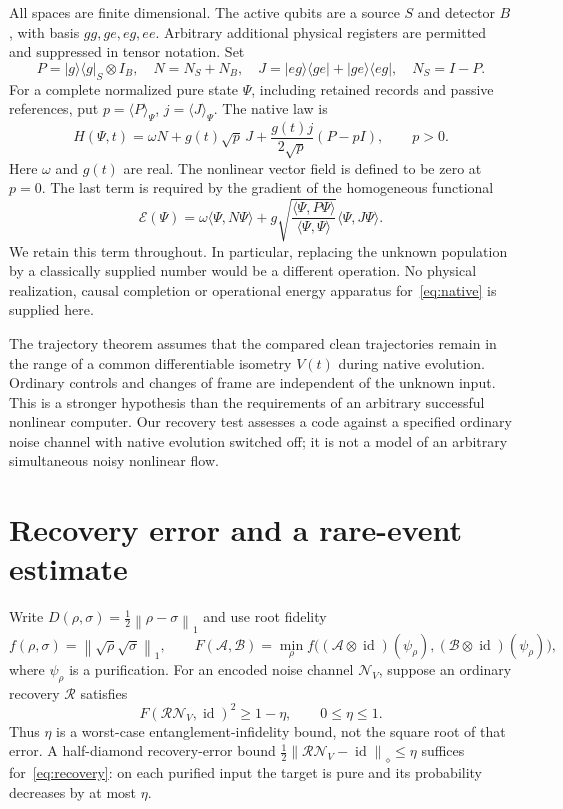 \documentclass[11pt]{article}
\newcommand{\id}{\operatorname{id}}
\newcommand{\norm}[1]{\left\lVert#1\right\rVert}
\newcommand{\ket}[1]{|#1\rangle}
\newcommand{\bra}[1]{\langle#1|}
\begin{document}
All spaces are finite dimensional. The active qubits are a source $S$ and detector $B$, with basis $gg,ge,eg,ee$. Arbitrary additional physical registers are permitted and suppressed in tensor notation. Set
\begin{equation}
 P=\ket g\bra g_S\otimes I_B,\quad N=N_S+N_B,\quad
 J=\ket{eg}\bra{ge}+\ket{ge}\bra{eg},\quad N_S=I-P.
\end{equation}
For a complete normalized pure state $\Psi$, including retained records and passive references, put $p=\langle P\rangle_\Psi$, $j=\langle J\rangle_\Psi$. The native law is
\begin{equation}
 H(\Psi,t)=\omega N+g(t)\sqrt p\,J+
 \frac{g(t)j}{2\sqrt p}(P-pI),\qquad p>0.\label{eq:native}
\end{equation}
Here $\omega$ and $g(t)$ are real. The nonlinear vector field is defined to be zero at $p=0$. The last term is required by the gradient of the homogeneous functional
\begin{equation}
 \mathcal E(\Psi)=\omega\langle\Psi,N\Psi\rangle+
 g\sqrt{\frac{\langle\Psi,P\Psi\rangle}{\langle\Psi,\Psi\rangle}}
 \langle\Psi,J\Psi\rangle.\label{eq:functional}
\end{equation}
We retain this term throughout. In particular, replacing the unknown population by a classically supplied number would be a different operation. No physical realization, causal completion or operational energy apparatus for~\eqref{eq:native} is supplied here.

The trajectory theorem assumes that the compared clean trajectories remain in the range of a common differentiable isometry $V(t)$ during native evolution. Ordinary controls and changes of frame are independent of the unknown input. This is a stronger hypothesis than the requirements of an arbitrary successful nonlinear computer. Our recovery test assesses a code against a specified ordinary noise channel with native evolution switched off; it is not a model of an arbitrary simultaneous noisy nonlinear flow.

\section{Recovery error and a rare-event estimate}
Write $D(\rho,\sigma)=\tfrac12\norm{\rho-\sigma}_1$ and use root fidelity
\begin{equation}
 f(\rho,\sigma)=\norm{\sqrt\rho\sqrt\sigma}_1,\qquad
 F(\mathcal A,\mathcal B)=\min_\rho
 f\bigl((\mathcal A\otimes\id)(\psi_\rho),
        (\mathcal B\otimes\id)(\psi_\rho)\bigr),
\end{equation}
where $\psi_\rho$ is a purification. For an encoded noise channel $\mathcal N_V$, suppose an ordinary recovery $\mathcal R$ satisfies
\begin{equation}
 F(\mathcal R\mathcal N_V,\id)^2\geq1-\eta,
 \qquad 0\leq\eta\leq1.\label{eq:recovery}
\end{equation}
Thus $\eta$ is a worst-case entanglement-infidelity bound, not the square root of that error. A half-diamond recovery-error bound $\tfrac12\norm{\mathcal R\mathcal N_V-\id}_\diamond\leq\eta$ suffices for~\eqref{eq:recovery}: on each purified input the target is pure and its probability decreases by at most $\eta$.
\end{document}
